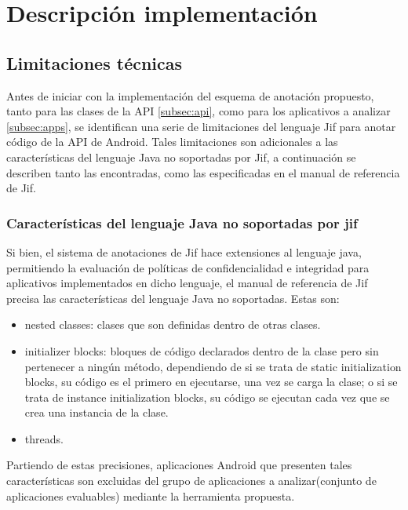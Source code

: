 \chapter{Descripción implementación}

\section{Limitaciones técnicas}
\label{sec:limitaciones}
Antes de iniciar con la implementación del esquema de anotación propuesto, tanto
para las clases de la API \ref{subsec:api}, como para los aplicativos a analizar
\ref{subsec:apps}, se identifican una serie de limitaciones del lenguaje
Jif para anotar código de la API de Android. 
Tales limitaciones son adicionales a las características del lenguaje Java no
soportadas por Jif, a continuación se describen tanto las encontradas, como las
especificadas en el manual de referencia de Jif.

\subsection{Características del lenguaje Java no soportadas por jif}
Si bien, el sistema de anotaciones de Jif hace extensiones al lenguaje java,
permitiendo la evaluación de políticas de confidencialidad e integridad para
aplicativos implementados en dicho lenguaje, el manual de referencia de Jif
precisa las características del lenguaje Java no soportadas\cite{jifRef}. Estas
son:
\begin{itemize}
  \item nested classes: clases que son definidas dentro de otras clases.
  \item initializer blocks: bloques de código declarados dentro de la clase pero
  sin pertenecer a ningún método, dependiendo de si se trata de static
  initialization blocks, su código es el primero en ejecutarse, una vez se
  carga la clase; o si se trata de instance initialization blocks, su código se
  ejecutan cada vez que se crea una instancia de la clase.
\item threads.
\end{itemize} 
Partiendo de estas precisiones, aplicaciones Android que presenten tales
características son excluidas del grupo de aplicaciones a analizar(conjunto de
aplicaciones evaluables) mediante la herramienta propuesta.

